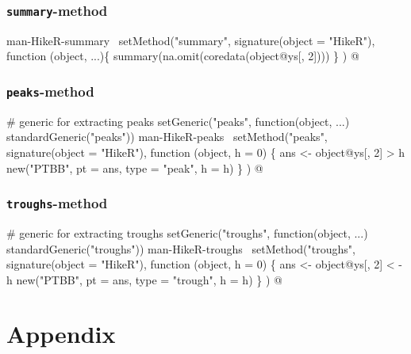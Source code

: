 \documentclass[a4paper]{article}
\begin{document}
\subsubsection{\texttt{summary}-method}

\nwenddocs{}\endmoddef
\LA{}man-HikeR-summary~{\nwtagstyle{}}\RA{}
setMethod("summary",
          signature(object = "HikeR"),
          function (object, ...)\{
              summary(na.omit(coredata(object@ys[, 2])))
          \}
)
\nwendcode{}@

\subsubsection{\texttt{peaks}-method}

\nwenddocs{}\endmoddef
# generic for extracting peaks
setGeneric("peaks", function(object, ...) standardGeneric("peaks"))
\LA{}man-HikeR-peaks~{\nwtagstyle{}}\RA{}
setMethod("peaks",
    signature(object = "HikeR"),
    function (object, h = 0) \{
        ans <- object@ys[, 2] > h
        new("PTBB", pt = ans, type = "peak", h = h)
    \}
)
\nwendcode{}@

\subsubsection{\texttt{troughs}-method}

\nwenddocs{}\endmoddef
# generic for extracting troughs
setGeneric("troughs", function(object, ...) standardGeneric("troughs"))
\LA{}man-HikeR-troughs~{\nwtagstyle{}}\RA{}
setMethod("troughs",
    signature(object = "HikeR"),
    function (object, h = 0) \{
        ans <- object@ys[, 2] < -h
        new("PTBB", pt = ans, type = "trough", h = h)
    \}
)
\nwendcode{}@


\section{Appendix}
\end{document}
